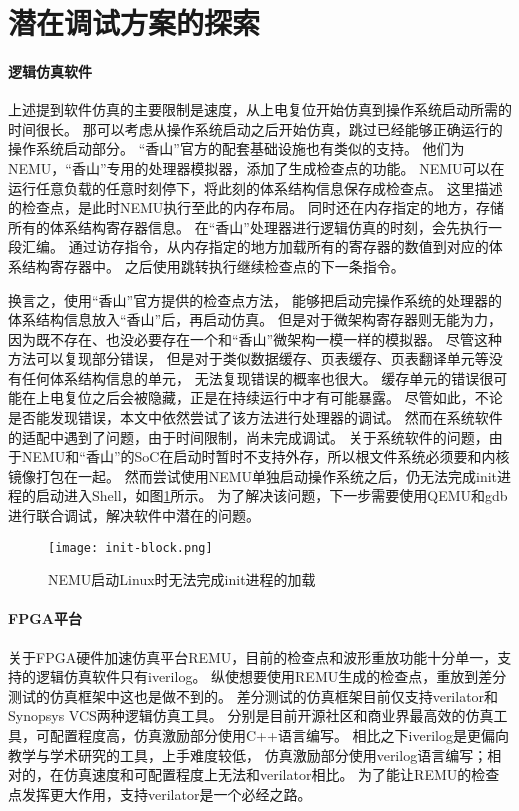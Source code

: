 \section{潜在调试方案的探索}

\paragraph{逻辑仿真软件}
上述提到软件仿真的主要限制是速度，从上电复位开始仿真到操作系统启动所需的时间很长。
那可以考虑从操作系统启动之后开始仿真，跳过已经能够正确运行的操作系统启动部分。
“香山”官方的配套基础设施也有类似的支持。
他们为NEMU，“香山”专用的处理器模拟器，添加了生成检查点的功能。
NEMU可以在运行任意负载的任意时刻停下，将此刻的体系结构信息保存成检查点。
这里描述的检查点，是此时NEMU执行至此的内存布局。
同时还在内存指定的地方，存储所有的体系结构寄存器信息。
在“香山”处理器进行逻辑仿真的时刻，会先执行一段汇编。
通过访存指令，从内存指定的地方加载所有的寄存器的数值到对应的体系结构寄存器中。
之后使用跳转执行继续检查点的下一条指令。

换言之，使用“香山”官方提供的检查点方法，
能够把启动完操作系统的处理器的体系结构信息放入“香山”后，再启动仿真。
但是对于微架构寄存器则无能为力，
因为既不存在、也没必要存在一个和“香山”微架构一模一样的模拟器。
尽管这种方法可以复现部分错误，
但是对于类似数据缓存、页表缓存、页表翻译单元等没有任何体系结构信息的单元，
无法复现错误的概率也很大。
缓存单元的错误很可能在上电复位之后会被隐藏，正是在持续运行中才有可能暴露。
尽管如此，不论是否能发现错误，本文中依然尝试了该方法进行处理器的调试。
然而在系统软件的适配中遇到了问题，由于时间限制，尚未完成调试。
关于系统软件的问题，由于NEMU和“香山”的SoC在启动时暂时不支持外存，所以根文件系统必须要和内核镜像打包在一起。
然而尝试使用NEMU单独启动操作系统之后，仍无法完成init进程的启动进入Shell，如图\ref{fig:init-block}所示。
为了解决该问题，下一步需要使用QEMU和gdb进行联合调试，解决软件中潜在的问题。

\begin{figure}[htbp]
    \centering
    \texttt{[image: init-block.png]}
    \caption{NEMU启动Linux时无法完成init进程的加载}
    \label{fig:init-block}
\end{figure}

\paragraph{FPGA平台}
关于FPGA硬件加速仿真平台REMU，目前的检查点和波形重放功能十分单一，支持的逻辑仿真软件只有iverilog。
纵使想要使用REMU生成的检查点，重放到差分测试的仿真框架中这也是做不到的。
差分测试的仿真框架目前仅支持verilator和Synopsys VCS两种逻辑仿真工具。
分别是目前开源社区和商业界最高效的仿真工具，可配置程度高，仿真激励部分使用C++语言编写。
相比之下iverilog是更偏向教学与学术研究的工具，上手难度较低，
仿真激励部分使用verilog语言编写；相对的，在仿真速度和可配置程度上无法和verilator相比。
为了能让REMU的检查点发挥更大作用，支持verilator是一个必经之路。

